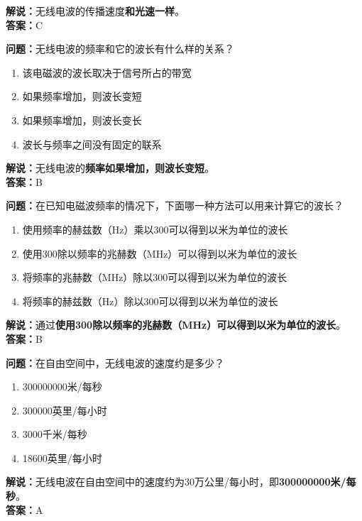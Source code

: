 \documentclass{ctexbook}
\begin{document}
\noindent\textbf{解说：}无线电波的传播速度\textbf{和光速一样}。\\\noindent\textbf{答案：}C


\bigskip


\noindent\textbf{问题：}无线电波的频率和它的波长有什么样的关系？

\begin{enumerate}[label=\Alph*), leftmargin=3em]
	\item 该电磁波的波长取决于信号所占的带宽
	\item 如果频率增加，则波长变短
	\item 如果频率增加，则波长变长
	\item 波长与频率之间没有固定的联系
\end{enumerate}

\noindent\textbf{解说：}无线电波的\textbf{频率如果增加，则波长变短}。\\\noindent\textbf{答案：}B


\bigskip


\noindent\textbf{问题：}在已知电磁波频率的情况下，下面哪一种方法可以用来计算它的波长？

\begin{enumerate}[label=\Alph*), leftmargin=3em]
	\item 使用频率的赫兹数（Hz）乘以300可以得到以米为单位的波长
	\item 使用300除以频率的兆赫数（MHz）可以得到以米为单位的波长
	\item 将频率的兆赫数（MHz）除以300可以得到以米为单位的波长
	\item 将频率的赫兹数（Hz）除以300可以得到以米为单位的波长
\end{enumerate}

\noindent\textbf{解说：}通过\textbf{使用300除以频率的兆赫数（MHz）可以得到以米为单位的波长}。\\\noindent\textbf{答案：}B


\bigskip


\noindent\textbf{问题：}在自由空间中，无线电波的速度约是多少？

\begin{enumerate}[label=\Alph*), leftmargin=3em]
	\item 300000000米/每秒
	\item 300000英里/每小时
	\item 3000千米/每秒
	\item 18600英里/每小时
\end{enumerate}

\noindent\textbf{解说：}无线电波在自由空间中的速度约为30万公里/每小时，即\textbf{300000000米/每秒}。\\\noindent\textbf{答案：}A
\end{document}
